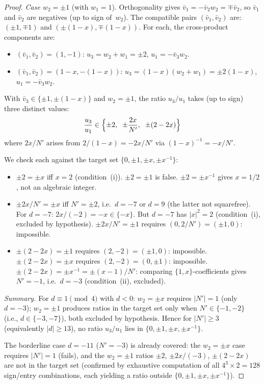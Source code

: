 \documentclass[12pt,a4paper]{article}
\begin{document}
\begin{proof}
\emph{Case $w_2 = \pm 1$} (with $w_1 = 1$).
Orthogonality gives $\bar{v}_1 = -\bar{v}_2 w_2 = \mp\bar{v}_2$,
so $\bar{v}_1$ and $\bar{v}_2$ are negatives (up to sign of~$w_2$).
The compatible pairs $(\bar{v}_1, \bar{v}_2)$ are:
$(\pm 1, \mp 1)$ and $(\pm(1{-}x), \mp(1{-}x))$.  For each, the
cross-product components are:
\begin{itemize}
\item $(\bar{v}_1, \bar{v}_2) = (1, -1)$: $u_3 = w_2 + w_1 = \pm 2$,
  $u_1 = -\bar{v}_3 w_2$.
\item $(\bar{v}_1, \bar{v}_2) = (1{-}x, -(1{-}x))$:
  $u_3 = (1{-}x)(w_2 + w_1) = \pm 2(1{-}x)$,
  $u_1 = -\bar{v}_3 w_2$.
\end{itemize}
With $\bar{v}_3 \in \{\pm 1, \pm(1{-}x)\}$ and $w_2 = \pm 1$,
the ratio $u_3/u_1$ takes (up to sign) three distinct values:
\[
  \frac{u_3}{u_1} \in \Bigl\{\pm 2,\;\; \pm\frac{2x}{N'},\;\;
  \pm(2 - 2x)\Bigr\}
\]
where $2x/N'$ arises from $2/(1{-}x) = -2x/N'$ via
$(1{-}x)^{-1} = -x/N'$.

We check each against the target set
$\{0, \pm 1, \pm x, \pm x^{-1}\}$:
\begin{itemize}
\item $\pm 2 = \pm x$ iff $x = 2$ (condition~(i)).
  $\pm 2 = \pm 1$ is false.  $\pm 2 = \pm x^{-1}$ gives
  $x = 1/2$, not an algebraic integer.
\item $\pm 2x/N' = \pm x$ iff $N' = \pm 2$, i.e.\ $d = -7$ or $d = 9$
  (the latter not squarefree).  For $d = -7$:
  $2x/(-2) = -x \in \{-x\}$.  But $d = -7$ has $|x|^2 = 2$
  (condition~(i), excluded by hypothesis).
  $\pm 2x/N' = \pm 1$ requires $(0, 2/N') = (\pm 1, 0)$: impossible.
\item $\pm(2 - 2x) = \pm 1$ requires $(2, -2) = (\pm 1, 0)$:
  impossible.
  $\pm(2 - 2x) = \pm x$ requires $(2, -2) = (0, \pm 1)$: impossible.
  $\pm(2 - 2x) = \pm x^{-1} = \pm(x{-}1)/N'$: comparing
  $\{1,x\}$-coefficients gives $N' = -1$, i.e.\ $d = -3$
  (condition~(ii), excluded).
\end{itemize}

\noindent\emph{Summary.}
For $d \equiv 1 \pmod{4}$ with $d < 0$:
$w_2 = \pm x$ requires $|N'| = 1$ (only $d = -3$);
$w_2 = \pm 1$ produces ratios in the target set only when
$N' \in \{-1, -2\}$ (i.e., $d \in \{-3, -7\}$), both excluded
by hypothesis.  Hence for $|N'| \geq 3$ (equivalently $|d| \geq 13$),
no ratio $u_3/u_1$ lies in $\{0, \pm 1, \pm x, \pm x^{-1}\}$.

The borderline case $d = -11$ ($N' = -3$) is already covered: the
$w_2 = \pm x$ case requires $|N'| = 1$ (fails), and the $w_2 = \pm 1$
ratios $\pm 2$, $\pm 2x/(-3)$, $\pm(2{-}2x)$ are not in the target
set (confirmed by exhaustive computation of all
$4^3 \times 2 = 128$ sign/entry combinations, each yielding a ratio
outside $\{0, \pm 1, \pm x, \pm x^{-1}\}$).


\end{proof}
\end{document}
